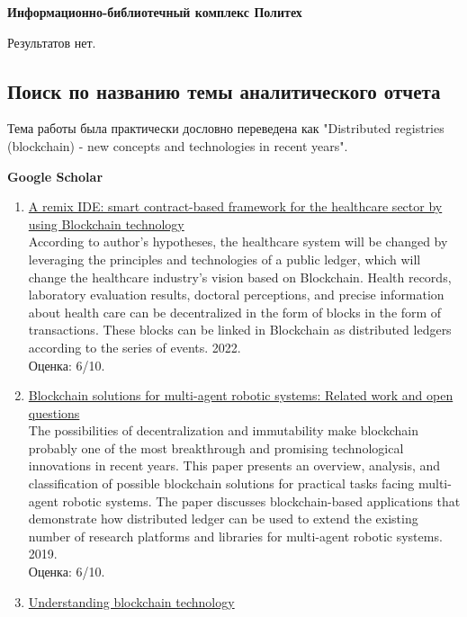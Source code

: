 \documentclass[a4paper, 12pt]{report}		%
\begin{document}
\textbf{Информационно-библиотечный комплекс Политех}

Результатов нет.


\subsection*{Поиск по названию темы аналитического отчета}

Тема работы была практически дословно переведена как "Distributed registries (blockchain) - new concepts and technologies in recent years".

\textbf{Google Scholar}

\begin{enumerate}
\item \href{https://link.springer.com/article/10.1007/s11042-020-10087-1}{A remix IDE: smart contract-based framework for the healthcare sector by using Blockchain technology}\\
According to author's hypotheses, the healthcare system will be changed by leveraging the principles and technologies of a public ledger, which will change the healthcare industry’s vision based on Blockchain. Health records, laboratory evaluation results, doctoral perceptions, and precise information about health care can be decentralized in the form of blocks in the form of transactions. These blocks can be linked in Blockchain as distributed ledgers according to the series of events. 2022.\\
Оценка: 6/10.
\item \href{https://arxiv.org/abs/1903.11041}{Blockchain solutions for multi-agent robotic systems: Related work and open questions}\\
The possibilities of decentralization and immutability make blockchain probably one of the most breakthrough and promising technological innovations in recent years. This paper presents an overview, analysis, and classification of possible blockchain solutions for practical tasks facing multi-agent robotic systems. The paper discusses blockchain-based applications that demonstrate how distributed ledger can be used to extend the existing number of research platforms and libraries for multi-agent robotic systems. 2019.\\
Оценка: 6/10.
\item \href{https://d1wqtxts1xzle7.cloudfront.net/60715489/Understanding_Blockchain_Technology20190926-26770-147v9qi-libre.pdf?1569545201=&response-content-disposition=inline%3B+filename%3DUnderstanding_Blockchain_Technology.pdf&Expires=1672345984&Signature=IE3vwviD0-bcwLX-LQC0kkQLP7XKvBmb5NxCrSsDFxCUl3W--YOrWN4jzxM1oX5jrODXclzsJNGp8-4XQwFtmdZEMvXUlUctzOt9qDrSBAg0qxeKX9HobjGcO4uqO2E2mmjEmgDyr9h25PpctVnjM2-IFjfR42pFci6wpHbp3WggQxkGe3OvbNrmnj94gOf~Bz41awMYwVPWEOrgXEWJrAo~kgxMh5BbVxyy8K-D67eYK9cqgfho8rt-uqU4vnRETvwlC5GNyiwCLmj~atniBlbTbuHKzf2X62Z92SFYv6enK-mOQOBR8qZj9NBcq3RVvsgdl-jLQGJ4Vsb8cj5i6A__&Key-Pair-Id=APKAJLOHF5GGSLRBV4ZA}{Understanding blockchain technology}\\

\end{enumerate}
\end{document}
